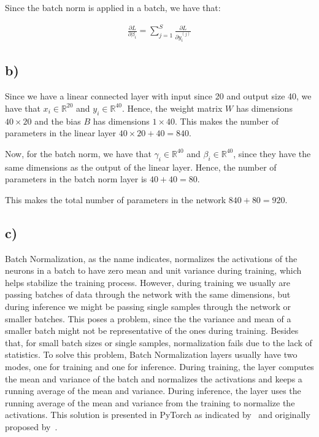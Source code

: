 \documentclass{article}
\begin{document}
Since the batch norm is applied in a batch, we have that:

\begin{align*}
    \frac{\partial L}{\partial \beta_i} = \sum_{j=1}^{S} \frac{\partial L}{\partial y_i^{(j)}}
\end{align*}

\subsection*{b)}

Since we have a linear connected layer with input since 20 and output size 40, we have that $x_i \in \mathbb{R}^{20}$ and $y_i \in \mathbb{R}^{40}$.
Hence, the weight matrix $W$ has dimensions $40 \times 20$ and the bias $B$ has dimensions $1 \times 40$.
This makes the number of parameters in the linear layer $40 \times 20 + 40 = 840$.

Now, for the batch norm, we have that $\gamma_i \in \mathbb{R}^{40}$ and $\beta_i \in \mathbb{R}^{40}$, 
since they have the same dimensions as the output of the linear layer. Hence, the number of parameters in the batch norm layer is $40 + 40 = 80$.

This makes the total number of parameters in the network $840 + 80 = 920$.

\subsection*{c)}

Batch Normalization, as the name indicates, normalizes the activations of the neurons in a batch to have
zero mean and unit variance during training, which helps stabilize the training process. However, during training
we usually are passing batches of data through the network with the same dimensions, but during inference we might
be passing single samples through the network or smaller batches. This poses a problem, since the the variance and
mean of a smaller batch might not be representative of the ones during training. Besides that, for small batch sizes
or single samples, normalization fails due to the lack of statistics. To solve this problem, Batch Normalization
layers usually have two modes, one for training and one for inference. During training, the layer computes the mean
and variance of the batch and normalizes the activations and keeps a running average of the mean and variance. During
inference, the layer uses the running average of the mean and variance from the training to normalize the activations.
This solution is presented in PyTorch as indicated by~\citep{BatchNorm1d} and originally proposed by~\citep{Ioffe_Szegedy_2015}.
\end{document}
